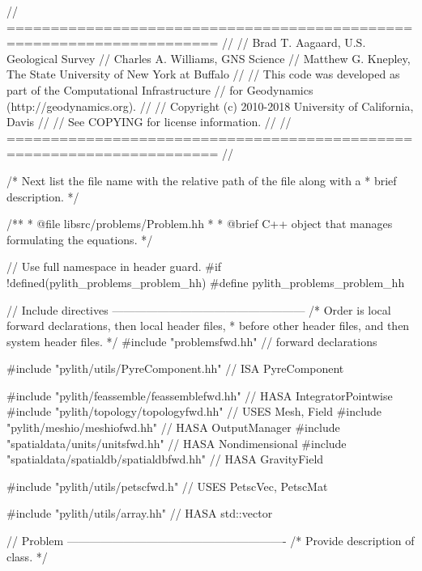 
\begin{cplusplus}
// ======================================================================
//
// Brad T. Aagaard, U.S. Geological Survey
// Charles A. Williams, GNS Science
// Matthew G. Knepley, The State University of New York at Buffalo
//
// This code was developed as part of the Computational Infrastructure
// for Geodynamics (http://geodynamics.org).
//
// Copyright (c) 2010-2018 University of California, Davis
//
// See COPYING for license information.
//
// ======================================================================
//

/* Next list the file name with the relative path of the file along with a
 * brief description.
 */  

/**
 * @file libsrc/problems/Problem.hh
 *
 * @brief C++ object that manages formulating the equations.
 */

// Use full namespace in header guard.
#if !defined(pylith_problems_problem_hh)
#define pylith_problems_problem_hh

// Include directives ---------------------------------------------------
/* Order is local forward declarations, then local header files,
 * before other header files, and then system header files.
 */
#include "problemsfwd.hh" // forward declarations

#include "pylith/utils/PyreComponent.hh" // ISA PyreComponent

#include "pylith/feassemble/feassemblefwd.hh" // HASA IntegratorPointwise
#include "pylith/topology/topologyfwd.hh" // USES Mesh, Field
#include "pylith/meshio/meshiofwd.hh" // HASA OutputManager
#include "spatialdata/units/unitsfwd.hh" // HASA Nondimensional
#include "spatialdata/spatialdb/spatialdbfwd.hh" // HASA GravityField

#include "pylith/utils/petscfwd.h" // USES PetscVec, PetscMat

#include "pylith/utils/array.hh" // HASA std::vector


// Problem ----------------------------------------------------------
/* Provide description of class.
 */
 

\end{cplusplus}
